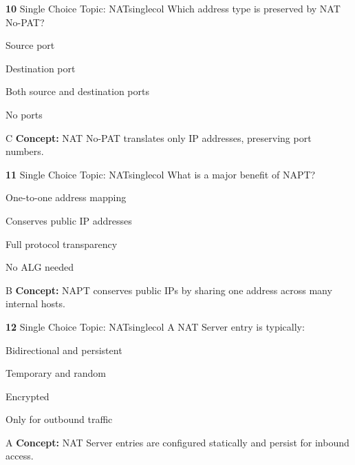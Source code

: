 \documentclass[10pt,a4paper]{article}
\begin{document}
\begin{qcard}{\color{white}\textbf{10} \hfill \small Single Choice \textbar{} Topic: NAT}{singlecol}
Which address type is preserved by NAT No-PAT?

\begin{qoptions}
\item Source port
\item Destination port
\item Both source and destination ports
\item No ports
\end{qoptions}
\begin{explainbox}{C}
\textbf{Concept:} NAT No-PAT translates only IP addresses, preserving port numbers.
\end{explainbox}
\end{qcard}

\begin{qcard}{\color{white}\textbf{11} \hfill \small Single Choice \textbar{} Topic: NAT}{singlecol}
What is a major benefit of NAPT?

\begin{qoptions}
\item One-to-one address mapping
\item Conserves public IP addresses
\item Full protocol transparency
\item No ALG needed
\end{qoptions}
\begin{explainbox}{B}
\textbf{Concept:} NAPT conserves public IPs by sharing one address across many internal hosts.
\end{explainbox}
\end{qcard}

\begin{qcard}{\color{white}\textbf{12} \hfill \small Single Choice \textbar{} Topic: NAT}{singlecol}
A NAT Server entry is typically:

\begin{qoptions}
\item Bidirectional and persistent
\item Temporary and random
\item Encrypted
\item Only for outbound traffic
\end{qoptions}
\begin{explainbox}{A}
\textbf{Concept:} NAT Server entries are configured statically and persist for inbound access.
\end{explainbox}
\end{qcard}
\end{document}
